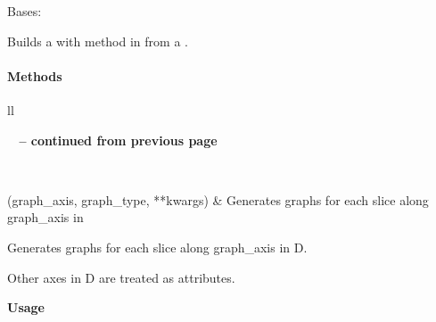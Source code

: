 \documentclass[letterpaper,10pt,english]{sphinxmanual}
\begin{document}

\begin{fulllineitems}
\label{tethne:tethne.builders.authorCollectionBuilder}
Bases: {\hyperref[tethne:tethne.builders.builder]{}}

Builds a {\hyperref[tethne:tethne.data.GraphCollection]{}} with method in 
{\hyperref[tethne.networks:module-tethne.networks.authors]{}} from a {\hyperref[tethne:tethne.data.DataCollection]{}} .
\paragraph{Methods}

\begin{longtable}{ll}
\hline
\endfirsthead

%
{{\bfseries \tablename\ \thetable{} -- continued from previous page}} \\
\hline
\endhead

\hline {} \\ \hline
\endfoot

\hline
\endlastfoot


{\hyperref[tethne:tethne.builders.authorCollectionBuilder.build]{}}(graph\_axis, graph\_type, **kwargs)
 & 
Generates graphs for each slice along graph\_axis in
\\\hline
\end{longtable}


\begin{fulllineitems}
\label{tethne:tethne.builders.authorCollectionBuilder.build}
Generates graphs for each slice along graph\_axis in
{\hyperref[tethne:tethne.data.DataCollection]{}} D.

Other axes in D are treated as attributes.

\textbf{Usage}


\end{fulllineitems}
\end{fulllineitems}
\end{document}
